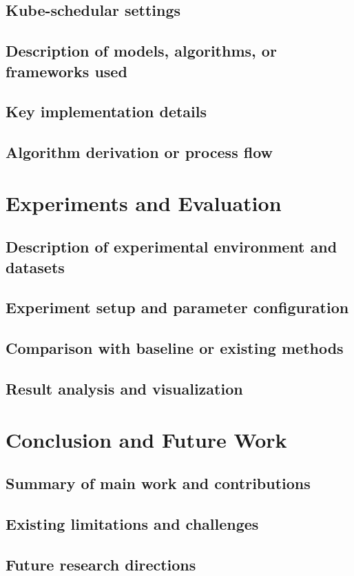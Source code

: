 \documentclass{article}
\begin{document}
\subsection{Kube-schedular settings}



\subsection{Description of models, algorithms, or frameworks used}
\subsection{Key implementation details}
\subsection{Algorithm derivation or process flow}

\section{Experiments and Evaluation}
\subsection{Description of experimental environment and datasets}
\subsection{Experiment setup and parameter configuration}
\subsection{Comparison with baseline or existing methods}
\subsection{Result analysis and visualization}

\section{Conclusion and Future Work}
\subsection{Summary of main work and contributions}
\subsection{Existing limitations and challenges}
\subsection{Future research directions}
\end{document}
